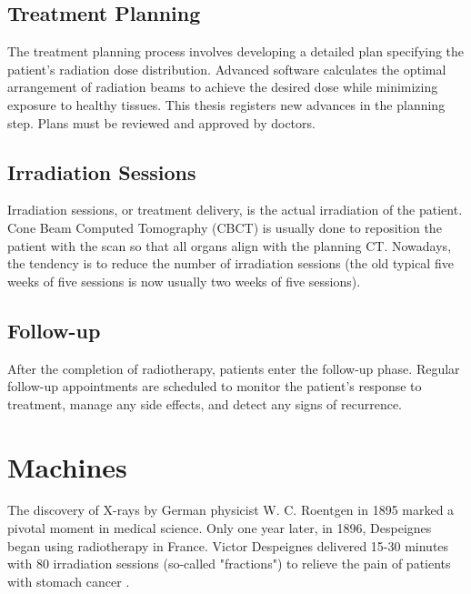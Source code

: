 \subsection{Treatment Planning}
The treatment planning process involves developing a detailed plan specifying the patient's radiation dose distribution.
Advanced software calculates the optimal arrangement of radiation beams to achieve the desired dose while minimizing exposure to healthy tissues.
This thesis registers new advances in the planning step.
Plans must be reviewed and approved by doctors.

\subsection{Irradiation Sessions}
Irradiation sessions, or treatment delivery, is the actual irradiation of the patient.
Cone Beam Computed Tomography (CBCT) is usually done to reposition the patient with the scan so that all organs align with the planning CT.
Nowadays, the tendency is to reduce the number of irradiation sessions (the old typical five weeks of five sessions is now usually two weeks of five sessions).

\subsection{Follow-up}
After the completion of radiotherapy, patients enter the follow-up phase.
Regular follow-up appointments are scheduled to monitor the patient's response to treatment, manage any side effects, and detect any signs of recurrence.






\section{Machines}
The discovery of X-rays by German physicist W. C. Roentgen in 1895 marked a pivotal moment in medical science.
Only one year later, in 1896, Despeignes began using radiotherapy in France.
Victor Despeignes delivered 15-30 minutes with 80 irradiation sessions (so-called "fractions") to relieve the pain of patients with stomach cancer \cite{Holsti1995}.

